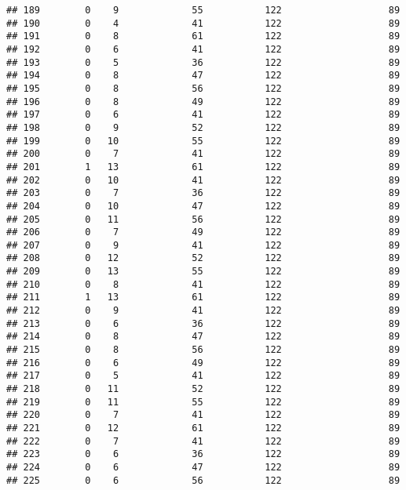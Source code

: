\documentclass[]{article}
\begin{document}
\begin{verbatim}
## 189        0    9             55           122                   89
## 190        0    4             41           122                   89
## 191        0    8             61           122                   89
## 192        0    6             41           122                   89
## 193        0    5             36           122                   89
## 194        0    8             47           122                   89
## 195        0    8             56           122                   89
## 196        0    8             49           122                   89
## 197        0    6             41           122                   89
## 198        0    9             52           122                   89
## 199        0   10             55           122                   89
## 200        0    7             41           122                   89
## 201        1   13             61           122                   89
## 202        0   10             41           122                   89
## 203        0    7             36           122                   89
## 204        0   10             47           122                   89
## 205        0   11             56           122                   89
## 206        0    7             49           122                   89
## 207        0    9             41           122                   89
## 208        0   12             52           122                   89
## 209        0   13             55           122                   89
## 210        0    8             41           122                   89
## 211        1   13             61           122                   89
## 212        0    9             41           122                   89
## 213        0    6             36           122                   89
## 214        0    8             47           122                   89
## 215        0    8             56           122                   89
## 216        0    6             49           122                   89
## 217        0    5             41           122                   89
## 218        0   11             52           122                   89
## 219        0   11             55           122                   89
## 220        0    7             41           122                   89
## 221        0   12             61           122                   89
## 222        0    7             41           122                   89
## 223        0    6             36           122                   89
## 224        0    6             47           122                   89
## 225        0    6             56           122                   89

\end{verbatim}
\end{document}
